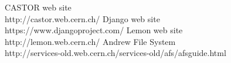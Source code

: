 \begin{thebibliography}{99}
 CASTOR web site\\ http://castor.web.cern.ch/
 Django web site\\ https://www.djangoproject.com/
 Lemon web site\\ http://lemon.web.cern.ch/
 Andrew File System\\http://services-old.web.cern.ch/services-old/afs/afsguide.html
\end{thebibliography}
